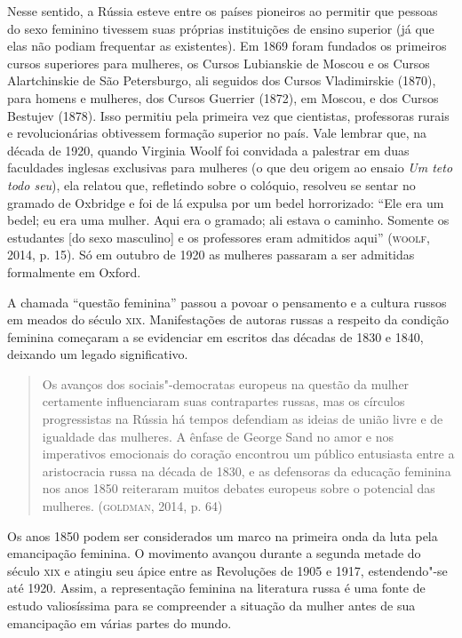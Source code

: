 \documentclass[11pt]{extarticle}
\begin{document}
Nesse sentido, a Rússia esteve entre os países pioneiros ao permitir que
pessoas do sexo feminino tivessem suas próprias instituições de ensino
superior (já que elas não podiam frequentar as existentes). Em 1869
foram fundados os primeiros cursos superiores para mulheres, os Cursos
Lubianskie de Moscou e os Cursos Alartchinskie de São Petersburgo, ali
seguidos dos Cursos Vladimirskie (1870), para homens e mulheres, dos
Cursos Guerrier (1872), em Moscou, e dos Cursos Bestujev (1878). Isso
permitiu pela primeira vez que cientistas, professoras rurais e
revolucionárias obtivessem formação superior no país. Vale lembrar que,
na década de 1920, quando Virginia Woolf foi convidada a palestrar em
duas faculdades inglesas exclusivas para mulheres (o que deu origem ao
ensaio \emph{Um teto todo seu}), ela relatou que, refletindo sobre o
colóquio, resolveu se sentar no gramado de Oxbridge e foi de lá expulsa
por um bedel horrorizado: ``Ele era um bedel; eu era uma mulher. Aqui
era o gramado; ali estava o caminho. Somente os estudantes {[}do sexo
masculino{]} e os professores eram admitidos aqui'' (\textsc{woolf}, 2014, p.
15). Só em outubro de 1920 as mulheres passaram a ser admitidas
formalmente em Oxford.

A chamada ``questão feminina'' passou a povoar o pensamento e a cultura
russos em meados do século \textsc{xix}. Manifestações de autoras russas a
respeito da condição feminina começaram a se evidenciar em escritos das
décadas de 1830 e 1840, deixando um legado significativo.

\begin{quote}
Os avanços dos sociais"-democratas europeus na questão da mulher
certamente influenciaram suas contrapartes russas, mas os círculos
progressistas na Rússia há tempos defendiam as ideias de união livre e
de igualdade das mulheres. A ênfase de George Sand no amor e nos
imperativos emocionais do coração encontrou um público entusiasta entre
a aristocracia russa na década de 1830, e as defensoras da educação
feminina nos anos 1850 reiteraram muitos debates europeus sobre o
potencial das mulheres. (\textsc{goldman}, 2014, p. 64)
\end{quote}

Os anos 1850 podem ser considerados um marco na primeira onda da luta
pela emancipação feminina. O movimento avançou durante a segunda metade
do século \textsc{xix} e atingiu seu ápice entre as Revoluções de 1905 e 1917,
estendendo"-se até 1920. Assim, a representação feminina na literatura
russa é uma fonte de estudo valiosíssima para se compreender a situação
da mulher antes de sua emancipação em várias partes do mundo.
\end{document}
